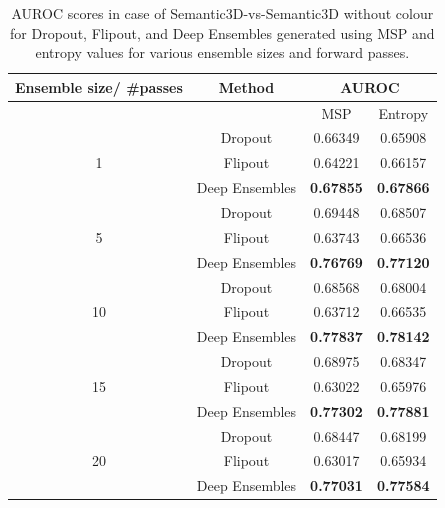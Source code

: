     \begin{table}[h!]
        \centering
        \begin{tabular}{cccc}
        \hline
        Ensemble size/ \#passes & Method               &  \multicolumn{2}{c}{AUROC}          \\ \hline
                                &                      &  MSP             & Entropy          \\ \hline
        \multirow{3}{*}{1}      & Dropout              & 0.66349          & 0.65908          \\
                                & Flipout              & 0.64221          & 0.66157          \\
                                & Deep Ensembles       & \textbf{0.67855} & \textbf{0.67866} \\ \hline
        \multirow{3}{*}{5}      & Dropout              & 0.69448          & 0.68507          \\
                                & Flipout              & 0.63743          & 0.66536          \\
                                & Deep Ensembles       & \textbf{0.76769} & \textbf{0.77120} \\ \hline
        \multirow{3}{*}{10}     & Dropout              & 0.68568          & 0.68004          \\
                                & Flipout              & 0.63712          & 0.66535          \\
                                & Deep Ensembles       & \textbf{0.77837} & \textbf{0.78142} \\ \hline
        \multirow{3}{*}{15}     & Dropout              & 0.68975          & 0.68347          \\
                                & Flipout              & 0.63022           & 0.65976          \\
                                & Deep Ensembles       & \textbf{0.77302} & \textbf{0.77881} \\ \hline
        \multirow{3}{*}{20}     & Dropout              & 0.68447          & 0.68199          \\
                                & Flipout              & 0.63017          & 0.65934          \\
                                & Deep Ensembles       & \textbf{0.77031} & \textbf{0.77584} \\ \hline
        \end{tabular}
        \caption{AUROC scores in case of Semantic3D-vs-Semantic3D without colour for Dropout, Flipout, and  Deep Ensembles generated using MSP and entropy values for various ensemble sizes and forward passes.}
        \label{tab:auroc_ood_2}
    \end{table}
